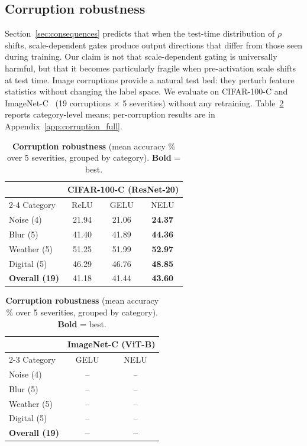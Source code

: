\subsection{Corruption robustness}\label{sec:robustness}

Section~\ref{sec:consequences} predicts that when the test-time distribution of $\rho$ shifts, scale-dependent gates produce output directions that differ from those seen during training.
Our claim is not that scale-dependent gating is universally harmful, but that it becomes particularly fragile when pre-activation scale shifts at test time.
Image corruptions provide a natural test bed: they perturb feature statistics without changing the label space.
We evaluate on CIFAR-100-C and ImageNet-C~\citep{hendrycks2019robustness} (19 corruptions $\times$ 5 severities) without any retraining.
Table~\ref{tab:corruption} reports category-level means; per-corruption results are in Appendix~\ref{app:corruption_full}.

\begin{table}[t]
\centering
\caption{\textbf{Corruption robustness} (mean accuracy \% over 5 severities, grouped by category). \textbf{Bold} = best.}
\label{tab:corruption}
\vspace{0.5em}
\small
\begin{tabular}{lccc}
\toprule
 & \multicolumn{3}{c}{\textbf{CIFAR-100-C} (ResNet-20)} \\
\cmidrule{2-4}
Category & ReLU & GELU & NELU \\
\midrule
Noise (4)     & 21.94 & 21.06 & \textbf{24.37} \\
Blur (5)      & 41.40 & 41.89 & \textbf{44.36} \\
Weather (5)   & 51.25 & 51.99 & \textbf{52.97} \\
Digital (5)   & 46.29 & 46.76 & \textbf{48.85} \\
\midrule
\textbf{Overall (19)} & 41.18 & 41.44 & \textbf{43.60} \\
\bottomrule
\end{tabular}

\vspace{0.8em}

\begin{tabular}{lcc}
\toprule
 & \multicolumn{2}{c}{\textbf{ImageNet-C} (ViT-B)} \\
\cmidrule{2-3}
Category & GELU & NELU \\
\midrule
Noise (4)   & -- & -- \\
Blur (5)    & -- & -- \\
Weather (5) & -- & -- \\
Digital (5) & -- & -- \\
\midrule
\textbf{Overall (19)} & \textbf{--} & \textbf{--} \\
\bottomrule
\end{tabular}
\end{table}

